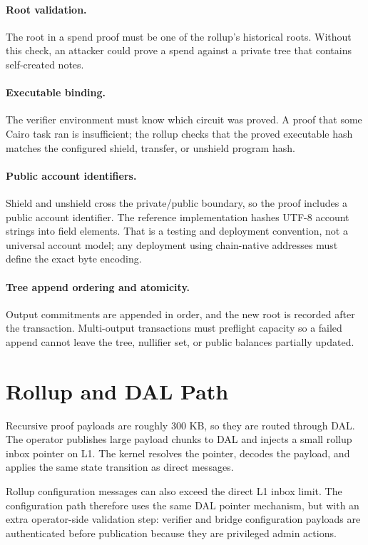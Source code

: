 \documentclass[11pt]{article}
\begin{document}
\paragraph{Root validation.}
The root in a spend proof must be one of the rollup's historical roots. Without
this check, an attacker could prove a spend against a private tree that contains
self-created notes.

\paragraph{Executable binding.}
The verifier environment must know which circuit was proved. A proof that some
Cairo task ran is insufficient; the rollup checks that the proved executable
hash matches the configured shield, transfer, or unshield program hash.

\paragraph{Public account identifiers.}
Shield and unshield cross the private/public boundary, so the proof includes a
public account identifier. The reference implementation hashes UTF-8 account
strings into field elements. That is a testing and deployment convention, not a
universal account model; any deployment using chain-native addresses must define
the exact byte encoding.

\paragraph{Tree append ordering and atomicity.}
Output commitments are appended in order, and the new root is recorded after the
transaction. Multi-output transactions must preflight capacity so a failed append
cannot leave the tree, nullifier set, or public balances partially updated.

\section{Rollup and DAL Path}

Recursive proof payloads are roughly 300 KB, so they are routed through DAL.
The operator publishes large payload chunks to DAL and injects a small rollup
inbox pointer on L1. The kernel resolves the pointer, decodes the payload, and
applies the same state transition as direct messages.

Rollup configuration messages can also exceed the direct L1 inbox limit. The
configuration path therefore uses the same DAL pointer mechanism, but with an
extra operator-side validation step: verifier and bridge configuration payloads
are authenticated before publication because they are privileged admin actions.
\end{document}
